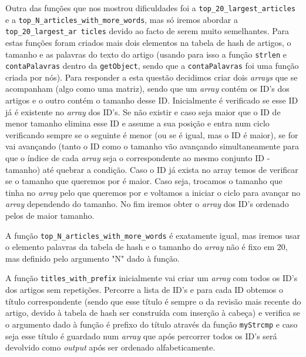 \documentclass[a4paper,12pt]{report}
\begin{document}
Outra das funções que nos mostrou dificuldades foi a {\tt top\_20\_largest\_articles} e a {\tt top\_N\_articles\_with\_more\_words}, mas só iremos abordar a {\tt top\_20\_largest\_ar
ticles} devido ao facto de serem muito semelhantes.
Para estas funções foram criados mais dois elementos na tabela de hash de artigos, o tamanho e as palavras do texto do artigo (usando para isso a função {\tt strlen} e {\tt contaPalavras} dentro da {\tt getObject}, sendo que a {\tt contaPalavras} foi uma função criada por nós).
Para responder a esta questão decidimos criar dois {\sl arrays} que se acompanham (algo como uma matriz), sendo que um {\sl array} contém os ID's dos artigos e o outro contém o tamanho desse ID.
Inicialmente é verificado se esse ID já é existente no {\sl array} dos ID's. Se não existir e caso seja maior que o ID de menor tamanho elimina esse ID e assume a sua posição e entra num ciclo verificando sempre se o seguinte é menor (ou se é igual, mas o ID é maior), se for vai avançando (tanto o ID como o tamanho vão avançando simultaneamente para que o índice de cada {\sl array} seja o correspondente ao mesmo conjunto ID - tamanho) até quebrar a condição. Caso o ID já exista no array temos de verificar se o tamanho que queremos por é maior. Caso seja, trocamos o tamanho que tinha no {\sl array} pelo que queremos por e voltamos a iniciar o ciclo para avançar no {\sl array} dependendo do tamanho.
No fim iremos obter o {\sl array} dos ID's ordenado pelos de maior tamanho.

A função {\tt top\_N\_articles\_with\_more\_words} é exatamente igual, mas iremos usar o elemento palavras da tabela de hash e o tamanho do {\sl array} não é fixo em 20, mas definido pelo argumento "N" dado à função.

A função {\tt titles\_with\_prefix} inicialmente vai criar um {\sl array} com todos os ID's dos artigos sem repetições. Percorre a lista de ID's e para cada ID obtemos o título correspondente (sendo que esse título é sempre o da revisão mais recente do artigo, devido à tabela de hash ser construída com inserção à cabeça) e verifica se o argumento dado à função é prefixo do título através da função {\tt myStrcmp} e caso seja esse título é guardado num {\sl array} que após percorrer todos os ID's será devolvido como {\sl output} após ser ordenado alfabeticamente.
\end{document}
